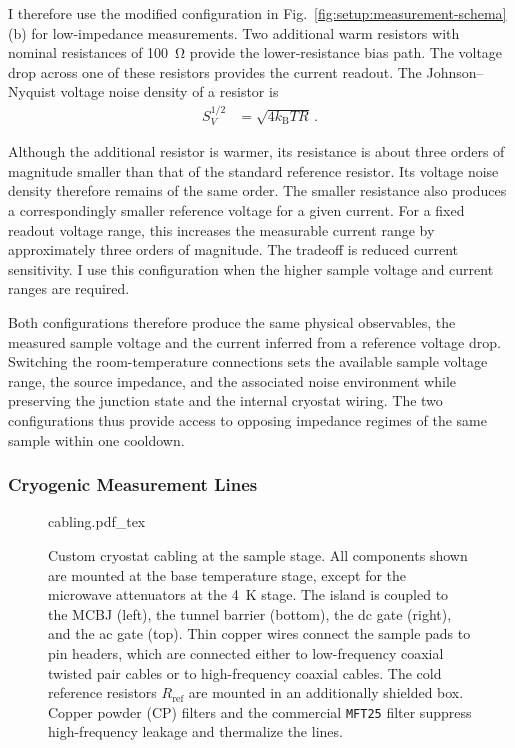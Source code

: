             I therefore use the modified configuration in Fig.~\ref{fig:setup:measurement-schema}(b) for low-impedance measurements. Two additional warm resistors with nominal resistances of \qty{100}{\ohm} provide the lower-resistance bias path. The voltage drop across one of these resistors provides the current readout. The Johnson--Nyquist voltage noise density of a resistor is~\cite{johnson_thermal_1928,nyquist_thermal_1928}
            \begin{align}
                S_V^{1/2} &= \sqrt{4k_\mathrm{B}TR}\,.
                \label{eq:setup:johnson-nyquist-reference}
            \end{align}

            Although the additional resistor is warmer, its resistance is about three orders of magnitude smaller than that of the standard reference resistor. Its voltage noise density therefore remains of the same order. The smaller resistance also produces a correspondingly smaller reference voltage for a given current. For a fixed readout voltage range, this increases the measurable current range by approximately three orders of magnitude. The tradeoff is reduced current sensitivity. I use this configuration when the higher sample voltage and current ranges are required.

            Both configurations therefore produce the same physical observables, the measured sample voltage and the current inferred from a reference voltage drop. Switching the room-temperature connections sets the available sample voltage range, the source impedance, and the associated noise environment while preserving the junction state and the internal cryostat wiring. The two configurations thus provide access to opposing impedance regimes of the same sample within one cooldown.

        \subsubsection*{Cryogenic Measurement Lines}

            \begin{figure}[p]
                \centering
                {\fontsize{7}{9}\selectfont
                {cabling.pdf_tex}
                }
                \caption{Custom cryostat cabling at the sample stage. All components shown are mounted at the base temperature stage, except for the microwave attenuators at the \qty{4}{\kelvin} stage. The island is coupled to the MCBJ (left), the tunnel barrier (bottom), the dc gate (right), and the ac gate (top). Thin copper wires connect the sample pads to pin headers, which are connected either to low-frequency coaxial twisted pair cables or to high-frequency coaxial cables. The cold reference resistors $R_\mathrm{ref}$ are mounted in an additionally shielded box. Copper powder (CP) filters and the commercial \texttt{MFT25} filter suppress high-frequency leakage and thermalize the lines.}
                \label{fig:setup:cabling}
            \end{figure}


